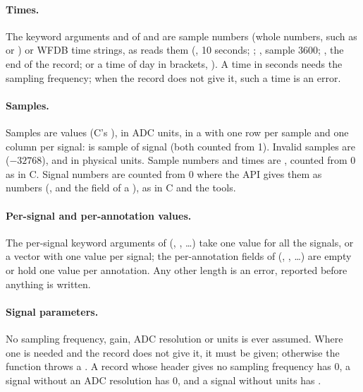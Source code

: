 \paragraph{Times.} The keyword arguments  and  of 
and  are sample numbers (whole numbers, such as  or
) or WFDB time strings, as  reads them (, 10
seconds; ; , sample 3600; , the end of the
record; or a time of day in brackets, ). A time in seconds needs the
sampling frequency; when the record does not give it, such a time is an error.

\paragraph{Samples.} Samples are  values (C's ), in ADC
units, in a  with one row per sample and one column per signal:
 is sample  of signal  (both counted from 1).
Invalid samples are  ($-32768$), and  in physical
units. Sample numbers and times are , counted from 0 as in C. Signal numbers
are counted from 0 where the API gives them as numbers (, and the
 field of a ), as in C and the tools.

\paragraph{Per-signal and per-annotation values.} The per-signal keyword arguments of
 (, , \ldots) take one value for all the
signals, or a vector with one value per signal; the per-annotation fields of
 (, , \ldots) are empty or hold one value per
annotation. Any other length is an error, reported before anything is written.

\paragraph{Signal parameters.} No sampling frequency, gain, ADC resolution or units is
ever assumed. Where one is needed and the record does not give it, it must be given;
otherwise the function throws a . A record whose header gives no sampling
frequency has  0, a signal without an ADC resolution has  0, and a
signal without units has  .

